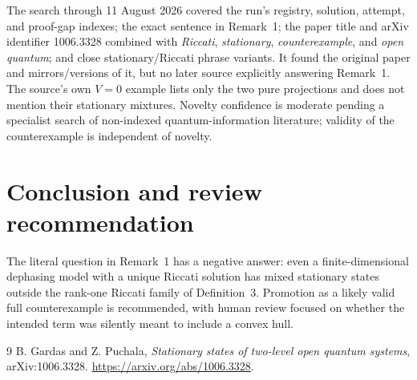 \documentclass[11pt]{article}
\begin{document}
The search through 11 August 2026 covered the run's registry, solution,
attempt, and proof-gap indexes; the exact sentence in Remark~1; the paper
title and arXiv identifier 1006.3328 combined with \emph{Riccati},
\emph{stationary}, \emph{counterexample}, and \emph{open quantum}; and close
stationary/Riccati phrase variants. It found the original paper and
mirrors/versions of it, but no later source explicitly answering Remark~1.
The source's own $V=0$ example lists only the two pure projections and does
not mention their stationary mixtures. Novelty confidence is moderate pending
a specialist search of non-indexed quantum-information literature; validity
of the counterexample is independent of novelty.

\section{Conclusion and review recommendation}

The literal question in Remark~1 has a negative answer: even a
finite-dimensional dephasing model with a unique Riccati solution has mixed
stationary states outside the rank-one Riccati family of Definition~3.
Promotion as a likely valid full counterexample is recommended, with human
review focused on whether the intended term was silently meant to include a
convex hull.

\begin{thebibliography}{9}
B. Gardas and Z. Puchala,
\emph{Stationary states of two-level open quantum systems},
arXiv:1006.3328.
\url{https://arxiv.org/abs/1006.3328}.
\end{thebibliography}
\end{document}
